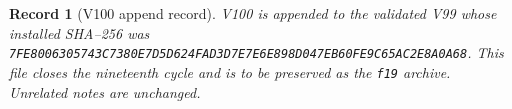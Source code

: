\documentclass[11pt]{article}
\newtheorem{record}[theorem]{Record}
\theoremstyle{remark}
\begin{document}
\begin{record}[V100 append record]
\label{rec:v19v100}
V100 is appended to the validated V99 whose installed SHA--256 was
\texttt{7FE8006305743C7380E7D5D624FAD3D7E7E6E898D047EB60FE9C65AC2E8A0A68}.
This file closes the nineteenth cycle and is to be preserved as the
\texttt{f19} archive.  Unrelated notes are unchanged.
\end{record}
\end{document}
